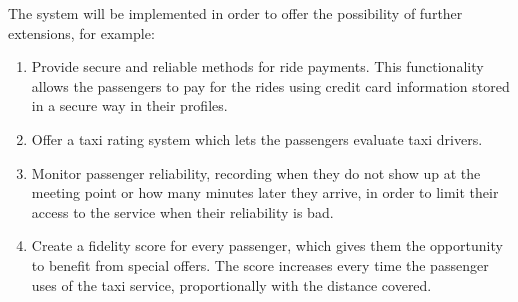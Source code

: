 The system will be implemented in order to offer the possibility of further extensions, for example:

\begin{enumerate}
    \item Provide secure and reliable methods for ride payments. This functionality allows the passengers to pay for the rides using credit card information stored in a secure way in their profiles.
    \item Offer a taxi rating system which lets the passengers evaluate taxi drivers.
    \item Monitor passenger reliability, recording when they do not show up at the meeting point or how many minutes later they arrive, in order to limit their access to the service when their reliability is bad.
    \item Create a fidelity score for every passenger, which gives them the opportunity to benefit from special offers. The score increases every time the passenger uses of the taxi service, proportionally with the distance covered.
\end{enumerate}
